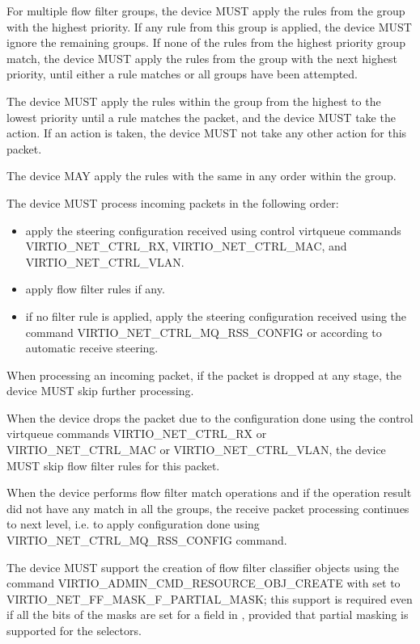 For multiple flow filter groups, the device MUST apply the rules from
the group with the highest priority. If any rule from this group is applied,
the device MUST ignore the remaining groups. If none of the rules from the
highest priority group match, the device MUST apply the rules from
the group with the next highest priority, until either a rule matches or
all groups have been attempted.

The device MUST apply the rules within the group from the highest to the
lowest priority until a rule matches the packet, and the device MUST take
the action. If an action is taken, the device MUST not take any other
action for this packet.

The device MAY apply the rules with the same  in any
order within the group.

The device MUST process incoming packets in the following order:
\begin{itemize}
\item apply the steering configuration received using control virtqueue
      commands VIRTIO_NET_CTRL_RX, VIRTIO_NET_CTRL_MAC, and
      VIRTIO_NET_CTRL_VLAN.
\item apply flow filter rules if any.
\item if no filter rule is applied, apply the steering configuration
      received using the command VIRTIO_NET_CTRL_MQ_RSS_CONFIG
      or according to automatic receive steering.
\end{itemize}

When processing an incoming packet, if the packet is dropped at any stage, the device
MUST skip further processing.

When the device drops the packet due to the configuration done using the control
virtqueue commands VIRTIO_NET_CTRL_RX or VIRTIO_NET_CTRL_MAC or VIRTIO_NET_CTRL_VLAN,
the device MUST skip flow filter rules for this packet.

When the device performs flow filter match operations and if the operation
result did not have any match in all the groups, the receive packet processing
continues to next level, i.e. to apply configuration done using
VIRTIO_NET_CTRL_MQ_RSS_CONFIG command.

The device MUST support the creation of flow filter classifier objects
using the command VIRTIO_ADMIN_CMD_RESOURCE_OBJ_CREATE with 
set to VIRTIO_NET_FF_MASK_F_PARTIAL_MASK;
this support is required even if all the bits of the masks are set for
a field in , provided that partial masking is supported
for the selectors.

